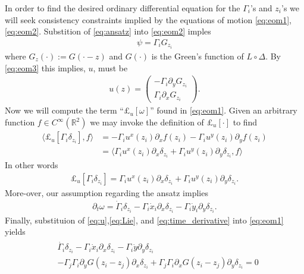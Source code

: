 \documentclass[12pt]{amsart}
\begin{document}
In order to find the desired ordinary differential equation for the $\Gamma_i$'s and $z_i$'s
we will seek consistency constraints implied by the equations of motion
\eqref{eq:eom1},\eqref{eq:eom2}. Substition of \eqref{eq:ansatz} into \eqref{eq:eom2} imples
\begin{align*}
  \psi = \Gamma_i G_{z_i}
\end{align*}
where $G_{z}(\cdot) := G( \cdot - z)$ and  $G(\cdot)$ is the Green's function of $L \circ \Delta$.
By \eqref{eq:eom3} this implies, $u$, must be
\begin{align}
  u(z) = \begin{pmatrix}
   - \Gamma_i \partial_y G_{z_i} \\
    \Gamma_i \partial_x G_{z_i}
  \end{pmatrix}. \label{eq:u}
\end{align}
Now we will compute the term ``$\pounds_u[\omega]$'' found in \eqref{eq:eom1}.
Given an arbitrary function $f \in C^\infty(\mathbb{R}^2)$ we may invoke the definition of $\pounds_u[\cdot]$ to find
\begin{align*}
  \langle \pounds_u[ \Gamma_i \delta_{z_i} ] , f \rangle &= - \Gamma_i u^x(z_i) \partial_x f(z_i) - \Gamma_i u^y(z_i) \partial_y f(z_i) \\
 &= \langle \Gamma_i u^x(z_i) \partial_x \delta_{z_i} + \Gamma_i u^y(z_i) \partial_y \delta_{z_i} , f \rangle
\end{align*}
In other words
\begin{align}
  \pounds_u[\Gamma_i \delta_{z_i}] =  \Gamma_i u^x(z_i) \partial_x \delta_{z_i} + \Gamma_i u^y(z_i) \partial_y \delta_{z_i}. \label{eq:Lie}
\end{align}
More-over, our assumption regarding the ansatz implies
\begin{align}
  \partial_t \omega = \dot{\Gamma}_i \delta_{z_i} - \Gamma_i \dot{x}_i \partial_x \delta_{z_i} - \Gamma_i \dot{y}_i \partial_y \delta_{z_i}. \label{eq:time_derivative}
\end{align}
Finally, substituion of \eqref{eq:u},\eqref{eq:Lie}, and \eqref{eq:time_derivative} into \eqref{eq:eom1} yields
\begin{align}
  \begin{split}
  &\dot{\Gamma_i} \delta_{z_i} - \Gamma_i \dot{x}_i \partial_x \delta_{z_i}
  - \Gamma_i \dot{y} \partial_y \delta_{z_i} \\
  &- \Gamma_j \Gamma_i \partial_yG(z_i - z_j) \partial_x \delta_{z_i} +
  \Gamma_j \Gamma_i \partial_x G(z_i-z_j) \partial_y \delta_{z_i}= 0 
  \end{split}
  \label{eq:eom4}
\end{align}
\end{document}
